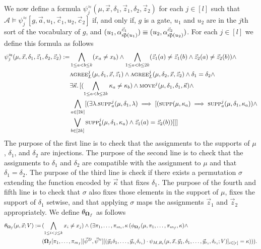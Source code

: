 \documentclass[../main/thesis.tex]{subfiles}
\begin{document}
We now define a formula $\psi^{\approx}_j(\mu, \vec{x}, \delta_1, \vec{z}_1,
\delta_2, \vec{z}_2)$ for each $j \in [l]$ such that $\mathcal{A} \models
\psi^{\approx}_j [g, \vec{a}, u_1, \vec{c}_1, u_2, \vec{c}_2]$ if, and only if,
$g$ is a gate, $u_1$ and $u_2$ are in the $j$th sort of the vocabulary of $g$,
and $(u_1, \alpha^{\vec{c}_1}_{\vec{\text{sp}}(u_1)}) \equiv (u_2,
\alpha^{\vec{c}_2}_{\vec{\text{sp}}(u_2)})$. For each $j \in [l]$ we define this
formula as follows
\begin{align*}
  \psi^{\approx}_j (\mu, \vec{x}, \delta_1, \vec{z}_1, \delta_2, \vec{z}_2) := & \bigwedge_{1 \leq a < b \leq k}(x_a \neq x_b) \land \bigwedge_{1 \leq a < b \leq 2k}(\vec{z}_1(a) \neq \vec{z}_1(b) \land \vec{z}_2(a) \neq \vec{z}_2(b))  \land  \\ & \textsc{agree}^j_L(\mu, \delta_1, \vec{x}, \vec{z}_1) \land \textsc{agree}^j_L(\mu, \delta_2, \vec{x}, \vec{z}_2) \land \delta_1 = \delta_2  \land \\ & \exists \vec{\kappa}. \, [(\bigwedge_{1 \leq a < b \leq 2k}\kappa_a \neq \kappa_b) \land \textsc{move}^{j}(\mu, \delta_1, \delta_1, \vec{\kappa}) \land \\ & \bigwedge_{a \in [2k]}[(\exists \lambda. \textsc{supp}^j_a(\mu, \delta_1, \lambda) \implies  [(\textsc{supp}(\mu, \kappa_a) \implies  \textsc{supp}^j_a(\mu, \delta_1, \kappa_a)) \land \\ &\bigvee_{b \in [2k]} \textsc{supp}^j_b(\mu, \delta_1, \kappa_a) \land \vec{z}_1 (a) = \vec{z}_2(b))]]]
\end{align*}
The purpose of the first line is to check that the assignments to the supports
of $\mu$, $\delta_1$, and $\delta_2$ are injections. The purpose of the second
line is to check that the assignments to $\delta_1$ and $\delta_2$ are
compatible with the assignment to $\mu$ and that $\delta_1 = \delta_2$. The
purpose of the third line is check if there exists a permutation $\sigma$
extending the function encoded by $\vec{\kappa}$ that fixes $\delta_1$. The
purpose of the fourth and fifth line is to check that $\sigma$ also fixes those
elements in the support of $\mu$, fixes the support of $\delta_1$ setwise, and
that applying $\sigma$ maps the assignments $\vec{z}_1$ and $\vec{z}_2$
appropriately. We define $\theta_{\mathbf{\mathbf{\Omega}}_f}$ as follows
\begin{align*}
  \theta_{\mathbf{\mathbf{\Omega}}_f} (\mu, \vec{x} ; V) := \,& (\bigwedge_{1 \leq i < j \leq k} x_i \neq x_j) \land (\exists \pi_1, \ldots, \pi_{m_i}, \kappa \, (\phi_{\mathbf{\mathbf{\Omega}}_f}(\mu, \pi_1, \ldots, \pi_{m_f}, \kappa) \land \\ &(\mathbf{\mathbf{\Omega}}_f [\pi_1, \ldots, \pi_{m_f}][\vec{\psi}^{D}, \vec{\psi}^{\approx}] [(\vec{y}_1 \delta_1, \ldots, \vec{y}_{r_i} \delta_{r_i}) \cdot \psi_{M, R_i} (\mu, \vec{x}, \vec{y}_1, \delta_1, \ldots, \vec{y}_{r_i}, \delta_{r_i}; V)]_{i \in [r]} = \kappa))).
\end{align*}
\end{document}
